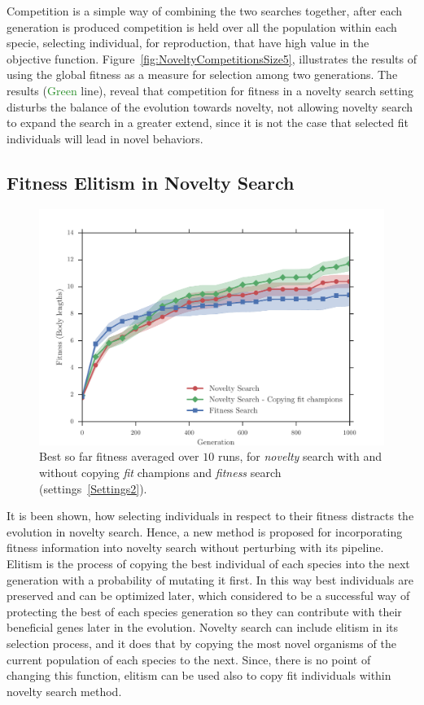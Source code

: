 Competition is a simple way of combining the two searches together, after each generation is produced competition is held over all the population within each specie, selecting individual, for reproduction, that have high value in the objective function. Figure~\ref{fig:NoveltyCompetitionsSize5}, illustrates the results of using the global fitness as a measure for selection among two generations. The results (\textcolor{ForestGreen}{Green} line), reveal that competition for fitness in a novelty search setting disturbs the balance of the evolution towards novelty, not allowing novelty search to expand the search in a greater extend, since it is not the case that selected fit individuals will lead in novel behaviors. 






\subsection*{Fitness Elitism in Novelty Search}

\begin{figure}[t!]
\centering
\includegraphics[width=1.0\textwidth]{../Figures/Results/CopyFitChampions10.pdf}
\caption{Best so far fitness averaged over $10$ runs, for \emph{novelty} search with and without copying \emph{fit} champions and \emph{fitness} search (settings~\ref{Settings2}).}
\label{fig:CopyFitChampions10}
\end{figure}

It is been shown, how selecting individuals in respect to their fitness distracts the evolution in novelty search. Hence, a new method is proposed for incorporating fitness information into novelty search without perturbing with its pipeline. Elitism is the process of copying the best individual of each species into the next generation with a probability of mutating it first. In this way best individuals are preserved and can be optimized later, which considered to be a successful way of protecting the best of each species generation so they can contribute with their beneficial genes later in the evolution. Novelty search can include elitism in its selection process, and it does that by copying the most novel organisms of the current population of each species to the next. Since, there is no point of changing this function, elitism can be used also to copy fit individuals within novelty search method. 

